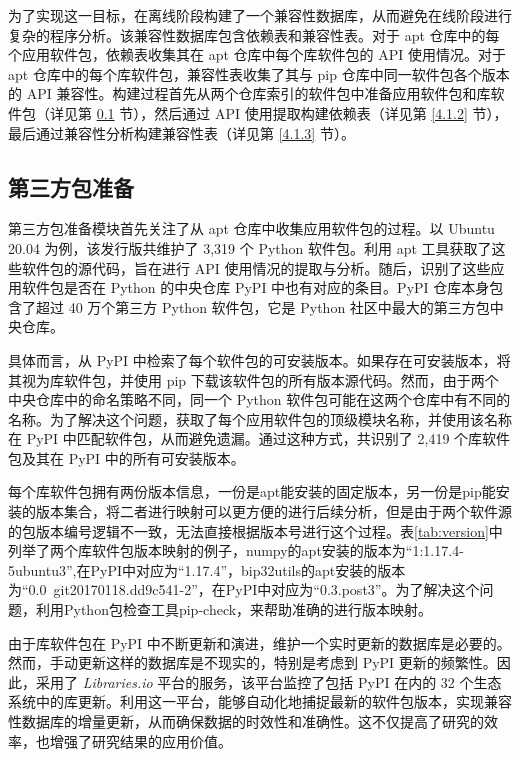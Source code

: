 为了实现这一目标，\tool{}在离线阶段构建了一个兼容性数据库，从而避免在线阶段进行复杂的程序分析。该兼容性数据库包含依赖表和兼容性表。对于 apt 仓库中的每个应用软件包，依赖表收集其在 apt 仓库中每个库软件包的 API 使用情况。对于 apt 仓库中的每个库软件包，兼容性表收集了其与 pip 仓库中同一软件包各个版本的 API 兼容性。构建过程首先从两个仓库索引的软件包中准备应用软件包和库软件包（详见第 \ref{4.1.1} 节），然后通过 API 使用提取构建依赖表（详见第 \ref{4.1.2} 节），最后通过兼容性分析构建兼容性表（详见第 \ref{4.1.3} 节）。

\subsection{第三方包准备}\label{4.1.1}
第三方包准备模块首先关注了从 apt 仓库中收集应用软件包的过程。以 Ubuntu 20.04 为例，该发行版共维护了 3,319 个 Python 软件包。\tool{}利用 apt 工具获取了这些软件包的源代码，旨在进行 API 使用情况的提取与分析。随后，\tool{}识别了这些应用软件包是否在 Python 的中央仓库 PyPI  中也有对应的条目。PyPI 仓库本身包含了超过 40 万个第三方 Python 软件包，它是 Python 社区中最大的第三方包中央仓库。

具体而言，\tool{}从 PyPI 中检索了每个软件包的可安装版本。如果存在可安装版本，\tool{}将其视为库软件包，并使用 pip 下载该软件包的所有版本源代码。然而，由于两个中央仓库中的命名策略不同，同一个 Python 软件包可能在这两个仓库中有不同的名称。为了解决这个问题，\tool{}获取了每个应用软件包的顶级模块名称，并使用该名称在 PyPI 中匹配软件包，从而避免遗漏。通过这种方式，\tool{}共识别了 2,419 个库软件包及其在 PyPI 中的所有可安装版本。

每个库软件包拥有两份版本信息，一份是apt能安装的固定版本，另一份是pip能安装的版本集合，将二者进行映射可以更方便的进行后续分析，但是由于两个软件源的包版本编号逻辑不一致，无法直接根据版本号进行这个过程。表\ref{tab:version}中列举了两个库软件包版本映射的例子，numpy的apt安装的版本为“1:1.17.4-5ubuntu3”,在PyPI中对应为“1.17.4”，bip32utils的apt安装的版本为“0.0~git20170118.dd9c541-2”，在PyPI中对应为“0.3.post3”。为了解决这个问题，\tool{}利用Python包检查工具pip-check，来帮助准确的进行版本映射。


由于库软件包在 PyPI 中不断更新和演进，维护一个实时更新的数据库是必要的。然而，手动更新这样的数据库是不现实的，特别是考虑到 PyPI 更新的频繁性。因此，\tool{}采用了 \textit{Libraries.io}  平台的服务，该平台监控了包括 PyPI 在内的 32 个生态系统中的库更新。利用这一平台，\tool{}能够自动化地捕捉最新的软件包版本，实现兼容性数据库的增量更新，从而确保数据的时效性和准确性。这不仅提高了研究的效率，也增强了研究结果的应用价值。


